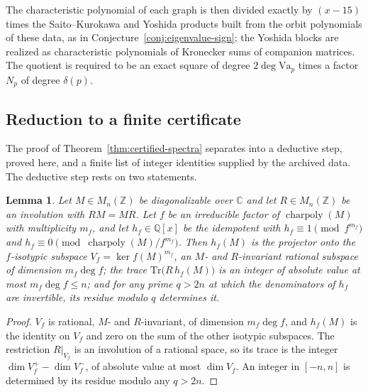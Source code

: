 \documentclass[11pt]{amsart}
\theoremstyle{plain}
\newtheorem{lemma}[theorem]{Lemma}
\theoremstyle{definition}
\newcommand{\Q}{\mathbb{Q}}
\newcommand{\Z}{\mathbb{Z}}
\newcommand{\C}{\mathbb{C}}
\newcommand{\Tr}{\mathrm{Tr}}
\newcommand{\Va}{\mathrm{Va}}
\DeclareMathOperator{\charp}{charpoly}
\providecommand{\Va}{\mathrm{Va}}
\providecommand{\charp}{\operatorname{charpoly}}
\begin{document}
	The characteristic polynomial of each graph is then divided exactly by
	$(x-15)$ times the Saito--Kurokawa and Yoshida products built from the
	orbit polynomials of these data, as in
	Conjecture~\ref{conj:eigenvalue-sign}; the Yoshida blocks are realized as
	characteristic polynomials of Kronecker sums of companion matrices. The
	quotient is required to be an exact square of degree $2\deg\Va_p$ times a
	factor $N_p$ of degree $\delta(p)$.
	
	\subsection{Reduction to a finite certificate}
	\label{ss:finitecert}
	
	The proof of Theorem~\ref{thm:certified-spectra} separates into a
	deductive step, proved here, and a finite list of integer identities
	supplied by the archived data. The deductive step rests on two statements.
	
	\begin{lemma}	\label{lem:onemod}
		Let $M\in M_n(\Z)$ be diagonalizable over $\C$ and let $R\in M_n(\Z)$ be an
		involution with $RM=MR$. Let $f$ be an irreducible factor of $\charp(M)$
		with multiplicity $m_f$, and let $h_f\in\Q[x]$ be the idempotent with
		$h_f\equiv1\pmod{f^{m_f}}$ and $h_f\equiv0\pmod{\charp(M)/f^{m_f}}$. Then
		$h_f(M)$ is the projector onto the $f$-isotypic subspace
		$V_f=\ker f(M)^{m_f}$, an $M$- and $R$-invariant rational subspace of
		dimension $m_f\deg f$; the trace $\Tr\bigl(R\,h_f(M)\bigr)$ is an integer
		of absolute value at most $m_f\deg f\le n$; and for any prime $q>2n$ at
		which the denominators of $h_f$ are invertible, its residue modulo $q$
		determines it.
	\end{lemma}
	
	\begin{proof}
		$V_f$ is rational, $M$- and $R$-invariant, of dimension $m_f\deg f$, and
		$h_f(M)$ is the identity on $V_f$ and zero on the sum of the other
		isotypic subspaces. The restriction $R|_{V_f}$ is an involution of a
		rational space, so its trace is the integer
		$\dim V_f^+-\dim V_f^-$, of absolute value at most $\dim V_f$. An integer
		in $[-n,n]$ is determined by its residue modulo any $q>2n$.
	\end{proof}
	
\end{document}
